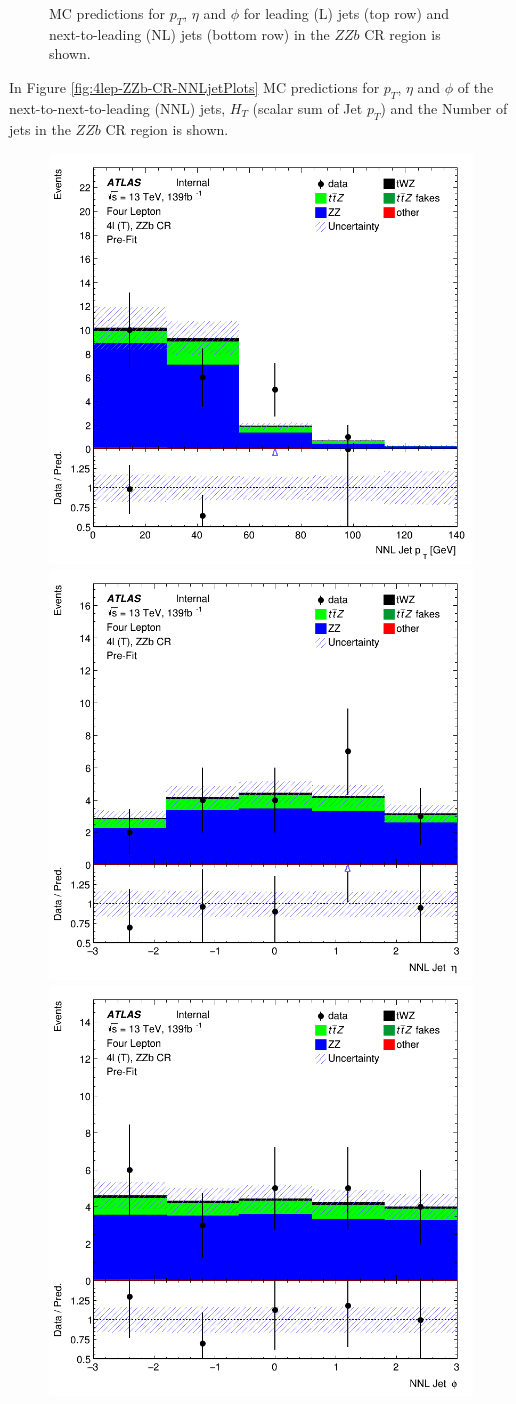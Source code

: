 \begin{figure}[htbp]
\begin{tabular}{ccc}
  \end{tabular}
    \caption{MC predictions for $p_{T}$, $\eta$ and $\phi$ for leading (L) jets (top row) and next-to-leading (NL) jets (bottom row) in the $ZZb$ CR region  is shown.}
    \label{fig:4lep-ZZb-CR-LandNjetPlots} 
\end{figure}

In Figure \ref{fig:4lep-ZZb-CR-NNLjetPlots} MC predictions for $p_{T}$, $\eta$ and $\phi$ of the next-to-next-to-leading (NNL) jets, $H_{T}$ (scalar sum of Jet $p_{T}$) and the Number of jets in the $ZZb$ CR region is shown.


\begin{figure}[htbp]
 \centering


    \includegraphics[width=.3\textwidth]{figures/PreFitPlots/lep4_ZZb_4T_NNLJet_pt.png} \quad
    \includegraphics[width=.3\textwidth]{figures/PreFitPlots/lep4_ZZb_4T_NNLJet_eta.png} \quad
    \includegraphics[width=.3\textwidth]{figures/PreFitPlots/lep4_ZZb_4T_NNLJet_phi.png}

    \medskip


\end{figure}
